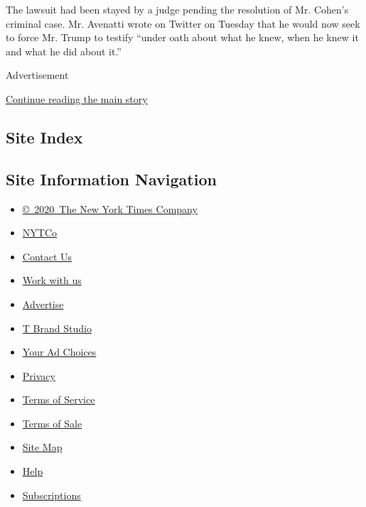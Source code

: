The lawsuit had been stayed by a judge pending the resolution of Mr.
Cohen's criminal case. Mr. Avenatti wrote on Twitter on Tuesday that he
would now seek to force Mr. Trump to testify ``under oath about what he
knew, when he knew it and what he did about it.''

Advertisement

\protect\hyperlink{after-bottom}{Continue reading the main story}

\hypertarget{site-index}{%
\subsection{Site Index}\label{site-index}}

\hypertarget{site-information-navigation}{%
\subsection{Site Information
Navigation}\label{site-information-navigation}}

\begin{itemize}
\tightlist
\item
  \href{https://help.nytimes3xbfgragh.onion/hc/en-us/articles/115014792127-Copyright-notice}{©~2020~The
  New York Times Company}
\end{itemize}

\begin{itemize}
\tightlist
\item
  \href{https://www.nytco.com/}{NYTCo}
\item
  \href{https://help.nytimes3xbfgragh.onion/hc/en-us/articles/115015385887-Contact-Us}{Contact
  Us}
\item
  \href{https://www.nytco.com/careers/}{Work with us}
\item
  \href{https://nytmediakit.com/}{Advertise}
\item
  \href{http://www.tbrandstudio.com/}{T Brand Studio}
\item
  \href{https://www.nytimes3xbfgragh.onion/privacy/cookie-policy\#how-do-i-manage-trackers}{Your
  Ad Choices}
\item
  \href{https://www.nytimes3xbfgragh.onion/privacy}{Privacy}
\item
  \href{https://help.nytimes3xbfgragh.onion/hc/en-us/articles/115014893428-Terms-of-service}{Terms
  of Service}
\item
  \href{https://help.nytimes3xbfgragh.onion/hc/en-us/articles/115014893968-Terms-of-sale}{Terms
  of Sale}
\item
  \href{https://spiderbites.nytimes3xbfgragh.onion}{Site Map}
\item
  \href{https://help.nytimes3xbfgragh.onion/hc/en-us}{Help}
\item
  \href{https://www.nytimes3xbfgragh.onion/subscription?campaignId=37WXW}{Subscriptions}
\end{itemize}
